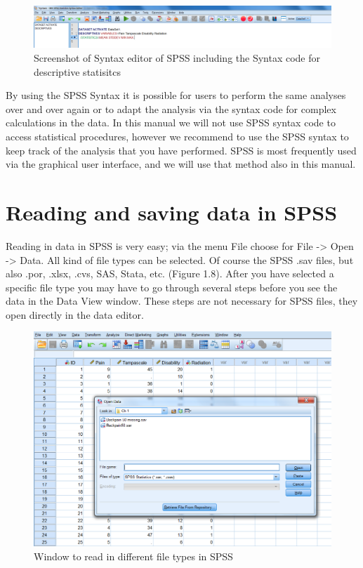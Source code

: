 \documentclass[]{book}
\begin{document}
\begin{figure}

{\centering \includegraphics[width=0.9\linewidth]{images/fig1.7} 

}

\caption{Screenshot of Syntax editor of SPSS including the Syntax code for descriptive statisitcs}\label{fig:fig7}
\end{figure}

By using the SPSS Syntax it is possible for users to perform the same
analyses over and over again or to adapt the analysis via the syntax
code for complex calculations in the data. In this manual we will not
use SPSS syntax code to access statistical procedures, however we
recommend to use the SPSS syntax to keep track of the analysis that you
have performed. SPSS is most frequently used via the graphical user
interface, and we will use that method also in this manual.

\section{Reading and saving data in
SPSS}\label{reading-and-saving-data-in-spss}

Reading in data in SPSS is very easy; via the menu File choose for File
-\textgreater{} Open -\textgreater{} Data. All kind of file types can be
selected. Of course the SPSS .sav files, but also .por, .xlsx, .cvs,
SAS, Stata, etc. (Figure 1.8). After you have selected a specific file
type you may have to go through several steps before you see the data in
the Data View window. These steps are not necessary for SPSS files, they
open directly in the data editor.

\begin{figure}

{\centering \includegraphics[width=0.9\linewidth]{images/fig1.8} 

}

\caption{Window to read in different file types in SPSS}\label{fig:fig8}
\end{figure}
\end{document}
